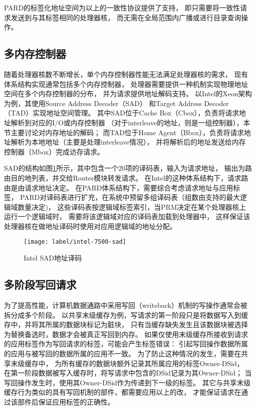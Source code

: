 PARD的标签化地址空间为以上的一致性协议提供了支持，
即只需要将一致性请求发送到与其标签相同的处理器核，
而无需在全局范围内广播或进行目录查询操作。



\subsection{多内存控制器}

随着处理器核数不断增长，单个内存控制器性能无法满足处理器核的需求，
现有体系结构实现通常包括多个内存控制器\cite{}，
处理器需要提供一种机制实现物理地址空间在多个内存控制器的分布，
并为请求提供地址解码支持。
以Intel的Xeon架构为例，其使用Source Address Decoder（SAD）
和Target Address Decoder（TAD）实现地址空间管理\cite{intel-xeon-7500}。
其中SAD位于Cache Box（Cbox），负责将请求地址解析到对应的I/O或内存控制器
（对于interleave的地址，则是一组控制器），本节主要讨论对内存地址的解码；
而TAD位于Home Agent（Bbox），负责将请求地址解析为本地地址（主要是处理interleave情况），
并将解析后的地址发送给内存控制器（Mbox）完成访存请求。

SAD的结构如图\ref{fig:intel-7500-sad}所示，其中包含一个20项的译码表，输入为请求地址，
输出为路由目的地列表，并交给Router模块转发请求。
在Intel的这种体系结构下，请求路由是由请求地址决定。
在PARD体系结构下，需要综合考虑请求地址与应用标签，
PARD对译码表进行扩充，在系统中预留多组译码表（组数由支持的最大逻辑域数量决定)，
这些译码表按逻辑域标签索引，当PRM决定在某个处理器核上运行一个逻辑域时，
需要将该逻辑域对应的译码表加载到处理器中，
这样保证该处理器核在做地址译码时使用对应用逻辑域的地址分配。

\begin{figure}[tb]
  \centering
  \texttt{[image: label/intel-7500-sad]}
  \caption[Intel SAD地址译码]{Intel SAD地址译码}
  \label{fig:intel-7500-sad}
\end{figure}


\subsection{多阶段写回请求}

为了提高性能，计算机数据通路中采用写回（writeback）机制的写操作通常会被拆分成多个阶段。
以共享末级缓存为例，写请求的第一阶段只是将数据写入到缓存中，并将其所属的数据块标记为脏块，
只有当缓存缺失发生且该数据块被选择为替换备选时，数据才会被真正写回到内存。
如果仅使用末级缓存所接收到请求的应用标签作为写回请求的标签，可能会产生标签错误：
引起写回操作数据所属的应用与被写回的数据所属的应用不一致。
为了防止这种情况的发生，需要在共享末级缓存中，
为所有缓存的数据块额外记录其所属应用的标签Owner-DSid，
在第一阶段数据被写入缓存时，将写请求中包含的DSid记录为其Owner-DSid；
当写回操作发生时，使用其Owner-DSid作为传递到下一级的标签。
其它与共享末级缓存行为类似的具有写回机制的部件，都需要应用以上的改，
才能保证请求在通过该部件后保证应用标签的正确性。

